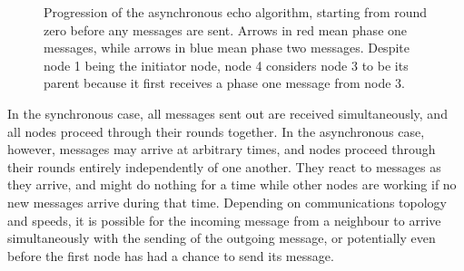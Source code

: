 \begin{figure}[htbp]
    \caption{Progression of the asynchronous echo algorithm, starting from round zero before any messages are sent.  Arrows in red mean phase one messages, while arrows in blue mean phase two messages.  Despite node 1 being the initiator node, node 4 considers node 3 to be its parent because it first receives a phase one message from node 3.}
    \label{fig:cps:echoasync}
\end{figure}

In the synchronous case, all messages sent out are received simultaneously, and all nodes proceed through their rounds together.  In the asynchronous case, however, messages may arrive at arbitrary times, and nodes proceed through their rounds entirely independently of one another.  They react to messages as they arrive, and might do nothing for a time while other nodes are working if no new messages arrive during that time.  Depending on communications topology and speeds, it is possible for the incoming message from a neighbour to arrive simultaneously with the sending of the outgoing message, or potentially even before the first node has had a chance to send its message.

